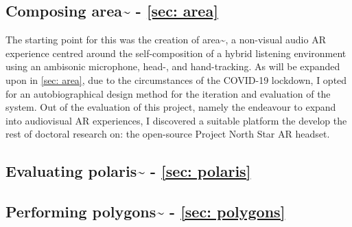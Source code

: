 \subsection{Composing area\textasciitilde{} - \autoref{sec: area}}
The starting point for this was the creation of area\textasciitilde{}, a non-visual audio AR experience centred around the self-composition of a hybrid listening environment using an ambisonic microphone, head-, and hand-tracking. As will be expanded upon in \autoref{sec: area}, due to the circumstances of the COVID-19 lockdown, I opted for an autobiographical design method for the iteration and evaluation of the system. Out of the evaluation of this project, namely the endeavour to expand into audiovisual AR experiences, I discovered a suitable platform the develop the rest of doctoral research on: the open-source Project North Star AR headset.

\subsection{Evaluating polaris\textasciitilde{} - \autoref{sec: polaris}}


\subsection{Performing polygons\textasciitilde{} - \autoref{sec: polygons}}
